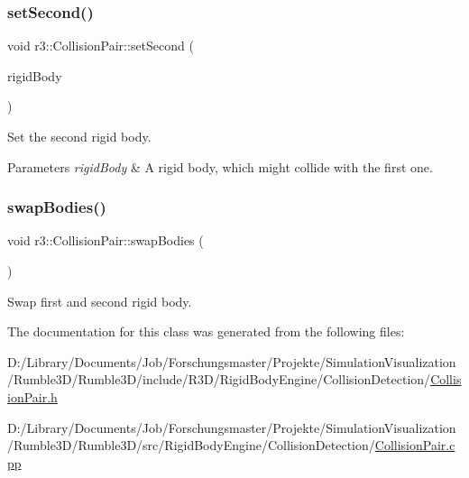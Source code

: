 \subsubsection{\texorpdfstring{set\+Second()}{setSecond()}}
{\footnotesize\ttfamily void r3\+::\+Collision\+Pair\+::set\+Second (\begin{DoxyParamCaption}\item[{\mbox{\hyperlink{classr3_1_1_rigid_body}{Rigid\+Body}} $\ast$}]{rigid\+Body }\end{DoxyParamCaption})}



Set the second rigid body. 


\begin{DoxyParams}{Parameters}
{\em rigid\+Body} & A rigid body, which might collide with the first one. \\
\hline
\end{DoxyParams}
\mbox{\label{classr3_1_1_collision_pair_a8ef5b5bae7be7db3ed2574ecd9e5bf9a}} 
\subsubsection{\texorpdfstring{swap\+Bodies()}{swapBodies()}}
{\footnotesize\ttfamily void r3\+::\+Collision\+Pair\+::swap\+Bodies (\begin{DoxyParamCaption}{ }\end{DoxyParamCaption})}



Swap first and second rigid body. 



The documentation for this class was generated from the following files\+:\begin{DoxyCompactItemize}
\item 
D\+:/\+Library/\+Documents/\+Job/\+Forschungsmaster/\+Projekte/\+Simulation\+Visualization/\+Rumble3\+D/\+Rumble3\+D/include/\+R3\+D/\+Rigid\+Body\+Engine/\+Collision\+Detection/\mbox{\hyperlink{_collision_pair_8h}{Collision\+Pair.\+h}}\item 
D\+:/\+Library/\+Documents/\+Job/\+Forschungsmaster/\+Projekte/\+Simulation\+Visualization/\+Rumble3\+D/\+Rumble3\+D/src/\+Rigid\+Body\+Engine/\+Collision\+Detection/\mbox{\hyperlink{_collision_pair_8cpp}{Collision\+Pair.\+cpp}}\end{DoxyCompactItemize}
